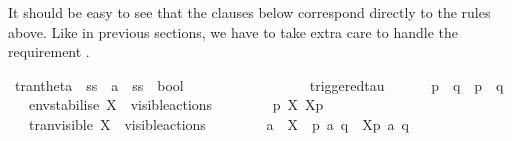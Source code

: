 \begin{isabellebody}
\begin{isamarkuptext}
It should be easy to see that the clauses below correspond directly to the rules above. Like in previous sections, we have to take extra care to handle the requirement .%
\end{isamarkuptext}\isamarkuptrue%
\isamarkupfalse%
\ tran{\isacharunderscore}{\kern0pt}theta\ {\isacharcolon}{\kern0pt}{\isacharcolon}{\kern0pt}\ {\isacartoucheopen}{\isacharprime}{\kern0pt}ss\ {\isasymRightarrow}\ {\isacharprime}{\kern0pt}a\ {\isasymRightarrow}\ {\isacharprime}{\kern0pt}ss\ {\isasymRightarrow}\ bool{\isacartoucheclose}\ \isanewline
\ \ {\isacharparenleft}{\kern0pt}{\isacartoucheopen}{\isacharunderscore}{\kern0pt}\ {\isasymlongmapsto}\isactrlsup {\isasymtheta}{\isacharunderscore}{\kern0pt}\ {\isacharunderscore}{\kern0pt}{\isacartoucheclose}\ {\isacharbrackleft}{\kern0pt}{}{}{\isacharcomma}{\kern0pt}\ {}{}{\isacharcomma}{\kern0pt}\ {}{}{\isacharbrackright}{\kern0pt}\ {}{}{\isacharparenright}{\kern0pt}\isanewline
\ \ \ \isanewline
\ \ \ \ triggered{\isacharunderscore}{\kern0pt}tau{\isacharcolon}{\kern0pt}\isanewline
\ \ \ \ \ \ {\isacartoucheopen}p\ {\isasymlongmapsto}{\isasymtau}\ q\ {\isasymLongrightarrow}\ {\isasymtheta}{\isacharparenleft}{\kern0pt}p{\isacharparenright}{\kern0pt}\ {\isasymlongmapsto}\isactrlsup {\isasymtheta}{\isasymtau}\ {\isasymtheta}{\isacharparenleft}{\kern0pt}q{\isacharparenright}{\kern0pt}{\isacartoucheclose}\isanewline
\ \ {\isacharbar}{\kern0pt}\ env{\isacharunderscore}{\kern0pt}stabilise{\isacharcolon}{\kern0pt}\ {\isacartoucheopen}X\ {\isasymsubseteq}\ visible{\isacharunderscore}{\kern0pt}actions\ {\isasymLongrightarrow}\ \isanewline
\ \ \ \ \ \ {\isasymtheta}{\isacharparenleft}{\kern0pt}p{\isacharparenright}{\kern0pt}\ {\isasymlongmapsto}\isactrlsup {\isasymtheta}{\isasymepsilon}{\isacharbrackleft}{\kern0pt}X{\isacharbrackright}{\kern0pt}\ {\isasymtheta}{\isacharbrackleft}{\kern0pt}X{\isacharbrackright}{\kern0pt}{\isacharparenleft}{\kern0pt}p{\isacharparenright}{\kern0pt}{\isacartoucheclose}\isanewline
\ \ {\isacharbar}{\kern0pt}\ tran{\isacharunderscore}{\kern0pt}visible{\isacharcolon}{\kern0pt}\ {\isacartoucheopen}X\ {\isasymsubseteq}\ visible{\isacharunderscore}{\kern0pt}actions\ {\isasymLongrightarrow}\ \isanewline
\ \ \ \ \ \ a\ {\isasymin}\ X\ {\isasymLongrightarrow}\ p\ {\isasymlongmapsto}a\ q\ {\isasymLongrightarrow}\ {\isasymtheta}{\isacharbrackleft}{\kern0pt}X{\isacharbrackright}{\kern0pt}{\isacharparenleft}{\kern0pt}p{\isacharparenright}{\kern0pt}\ {\isasymlongmapsto}\isactrlsup {\isasymtheta}a\ {\isasymtheta}{\isacharparenleft}{\kern0pt}q{\isacharparenright}{\kern0pt}{\isacartoucheclose}\isanewline

\end{isabellebody}
